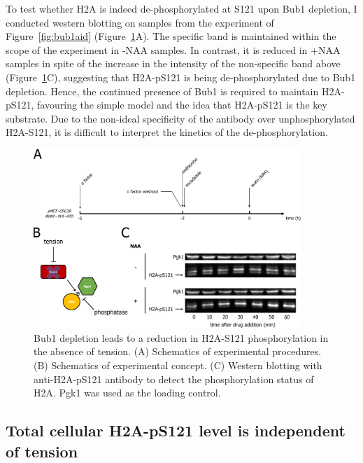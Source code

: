 To test whether H2A is indeed de-phosphorylated at S121 upon Bub1 depletion, I conducted western blotting on samples from the experiment of Figure~\ref{fig:bub1aid} (Figure~\ref{fig:ph2abub1aid}A). The specific band is maintained within the scope of the experiment in -NAA samples. In contrast, it is reduced in +NAA samples in spite of the increase in the intensity of the non-specific band above (Figure~\ref{fig:ph2abub1aid}C), suggesting that H2A-pS121 is being de-phosphorylated due to Bub1 depletion. Hence, the continued presence of Bub1 is required to maintain H2A-pS121, favouring the simple model and the idea that H2A-pS121 is the key substrate. Due to the non-ideal specificity of the antibody over unphosphorylated H2A-S121, it is difficult to interpret the kinetics of the de-phosphorylation. 

\begin{figure}[htbp]
  \centering
  \includegraphics[width=0.9\textwidth]{chapter3/figures/pH2A Bub1-AID.pdf}
  \caption[Bub1 depletion leads to a reduction in H2A-S121 phosphorylation in the absence of tension]{Bub1 depletion leads to a reduction in H2A-S121 phosphorylation in the absence of tension. (A) Schematics of experimental procedures. (B) Schematics of experimental concept. (C) Western blotting with anti-H2A-pS121 antibody to detect the phosphorylation status of H2A. Pgk1 was used as the loading control.}
  \label{fig:ph2abub1aid}
\end{figure} 

\subsection{Total cellular H2A-pS121 level is independent of tension}
\label{subsec:totalph2aindten}

